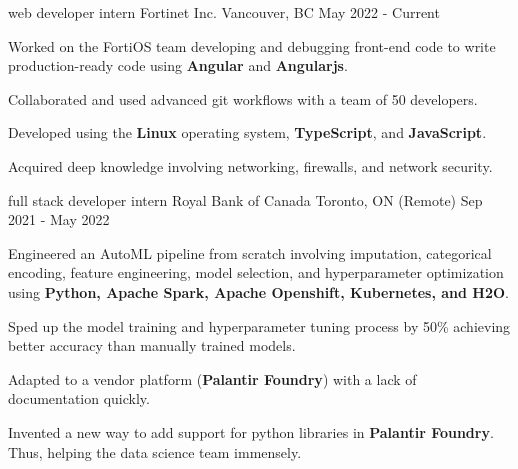 

\begin{cventries}

  \cventry
    {web developer intern} %
    {Fortinet Inc.} %
    {Vancouver, BC} %
    {May 2022 - Current} %
    {
      \begin{cvitems} %
        \item {Worked on the FortiOS team developing and debugging front-end code to write production-ready code using \textbf{Angular} and \textbf{Angularjs}.}        
        \item {Collaborated and used advanced git workflows with a team of 50 developers.}         
        \item {Developed using the \textbf{Linux} operating system, \textbf{TypeScript}, and \textbf{JavaScript}.}    
        \item {Acquired deep knowledge involving networking, firewalls, and network security.}  
      \end{cvitems}
    } 

  \cventry
    {full stack developer intern} %
    {Royal Bank of Canada} %
    {Toronto, ON (Remote)} %
    {Sep 2021 - May 2022} %
    {
      \begin{cvitems} %
        \item {Engineered an AutoML pipeline from scratch involving imputation, categorical encoding, feature engineering, model selection, and hyperparameter optimization using \textbf{Python, Apache Spark, Apache Openshift, Kubernetes, and H2O}.}  
        \item {Sped up the model training and hyperparameter tuning process by 50\% achieving better accuracy than manually trained models.}    
        \item {Adapted to a vendor platform (\textbf{Palantir Foundry}) with a lack of documentation quickly.} 
        \item {Invented a new way to add support for python libraries in \textbf{Palantir Foundry}. Thus, helping the data science team immensely.} 
      \end{cvitems}
    }


\end{cventries}
